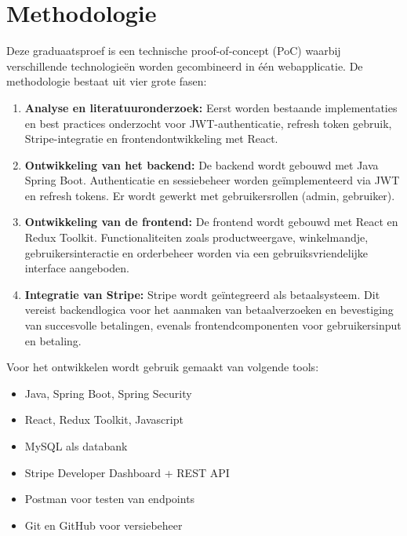 

\section{Methodologie}%
\label{sec:methodologie}

Deze graduaatsproef is een technische proof-of-concept (PoC) waarbij verschillende technologieën worden gecombineerd in één webapplicatie. De methodologie bestaat uit vier grote fasen:

\begin{enumerate}
  \item \textbf{Analyse en literatuuronderzoek:} Eerst worden bestaande implementaties en best practices onderzocht voor JWT-authenticatie, refresh token gebruik, Stripe-integratie en frontendontwikkeling met React.
  \item \textbf{Ontwikkeling van het backend:} De backend wordt gebouwd met Java Spring Boot. Authenticatie en sessiebeheer worden geïmplementeerd via JWT en refresh tokens. Er wordt gewerkt met gebruikersrollen (admin, gebruiker).
  \item \textbf{Ontwikkeling van de frontend:} De frontend wordt gebouwd met React en Redux Toolkit. Functionaliteiten zoals productweergave, winkelmandje, gebruikersinteractie en orderbeheer worden via een gebruiksvriendelijke interface aangeboden.
  \item \textbf{Integratie van Stripe:} Stripe wordt geïntegreerd als betaalsysteem. Dit vereist backendlogica voor het aanmaken van betaalverzoeken en bevestiging van succesvolle betalingen, evenals frontendcomponenten voor gebruikersinput en betaling.
\end{enumerate}

Voor het ontwikkelen wordt gebruik gemaakt van volgende tools:

\begin{itemize}
  \item Java, Spring Boot, Spring Security
  \item React, Redux Toolkit, Javascript
  \item MySQL als databank
  \item Stripe Developer Dashboard + REST API
  \item Postman voor testen van endpoints
  \item Git en GitHub voor versiebeheer
\end{itemize}

